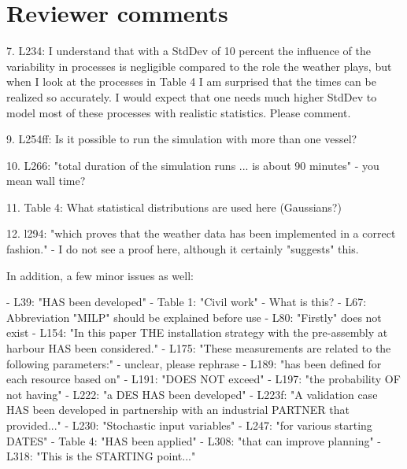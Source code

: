 \section{Reviewer comments}

7. L234: I understand that with a StdDev of 10 percent the influence of the variability in processes is negligible compared to the role the weather plays, but when I look at the processes in Table 4 I am surprised that the times can be realized so accurately. I would expect that one needs much higher StdDev to model most of these processes with realistic statistics. Please comment.

9. L254ff: Is it possible to run the simulation with more than one vessel?

10. L266: "total duration of the simulation runs ... is about 90 minutes" - you mean wall time?

11. Table 4: What statistical distributions are used here (Gaussians?)

12. l294: "which proves that the weather data has been implemented in a correct fashion." - I do not see a proof here, although it certainly "suggests" this.


In addition, a few minor issues as well:

- L39: "HAS been developed"
- Table 1: "Civil work" - What is this?
- L67: Abbreviation "MILP" should be explained before use
- L80: "Firstly" does not exist
- L154: "In this paper THE installation strategy with the pre-assembly at harbour HAS been considered."
- L175: "These measurements are related to the following parameters:" - unclear, please rephrase
- L189: "has been defined for each resource based on"
- L191: "DOES NOT exceed"
- L197: "the probability OF not having"
- L222: "a DES HAS been developed"
- L223f: "A validation case HAS been developed in partnership with an industrial PARTNER that provided..."
- L230: "Stochastic input variables"
- L247: "for various starting DATES"
- Table 4: "HAS been applied"
- L308: "that can improve planning"
- L318: "This is the STARTING point..."
